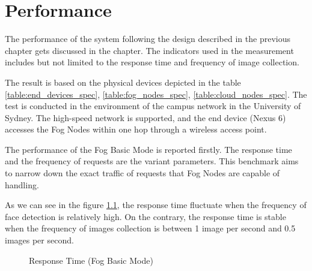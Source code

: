 \chapter{Performance} \label{chap:performance}
The performance of the system following the design described in the previous chapter gets discussed in the chapter. The indicators used in the measurement includes but not limited to the response time and frequency of image collection.

The result is based on the physical devices depicted in the table \ref{table:end_devices_spec}, \ref{table:fog_nodes_spec}, \ref{table:cloud_nodes_spec}. The test is conducted in the environment of the campus network in the University of Sydney. The high-speed network is supported, and the end device (Nexus 6) accesses the Fog Nodes within one hop through a wireless access point.

The performance of the Fog Basic Mode is reported firstly. The response time and the frequency of requests are the variant parameters. This benchmark aims to narrow down the exact traffic of requests that Fog Nodes are capable of handling.

As we can see in the figure \ref{fig:response_time_fog_basic}, the response time fluctuate when the frequency of face detection is relatively high. On the contrary, the response time is stable when the frequency of images collection is between 1 image per second and 0.5 images per second.


\begin{figure}
\centering
{}
\caption{Response Time (Fog Basic Mode)}
\label{fig:response_time_fog_basic}
\end{figure}

